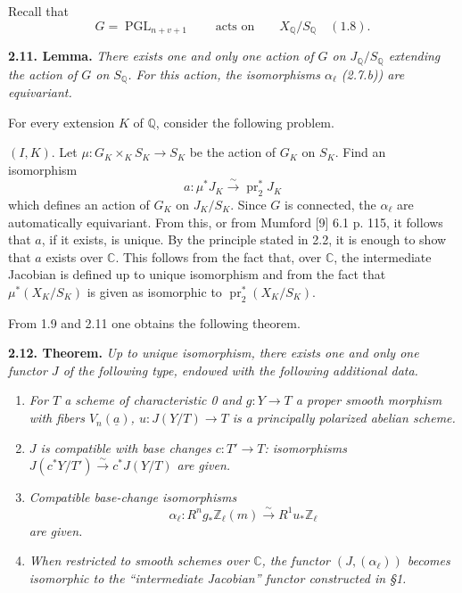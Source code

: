 \documentclass[10pt]{article}
\newcommand{\C}{\mathbb C}
\newcommand{\Q}{\mathbb Q}
\newcommand{\Z}{\mathbb Z}
\newcommand{\PGL}{\operatorname{PGL}}
\newcommand{\pr}{\operatorname{pr}}
\newcommand{\iso}{\xrightarrow{\sim}}
\newcommand{\sourcebreak}{\clearpage}
\begin{document}
Recall that
\[
G=\PGL_{n+v+1}\qquad\text{acts on}\qquad X_\Q/S_\Q\quad(1.8).
\]

\noindent\textbf{2.11. Lemma.} \emph{There exists one and only one action of \(G\) on \(J_\Q/S_\Q\) extending the action of \(G\) on \(S_\Q\). For this action, the isomorphisms \(\alpha_\ell\) (2.7.b)) are equivariant.}

For every extension \(K\) of \(\Q\), consider the following problem.

\noindent\((I,K)\). Let \(\mu:G_K\times_K S_K\longrightarrow S_K\) be the action of \(G_K\) on \(S_K\). Find an isomorphism
\[
a:\mu^*J_K\iso \pr_2^*J_K
\]
which defines an action of \(G_K\) on \(J_K/S_K\). Since \(G\) is connected, the \(\alpha_\ell\) are automatically equivariant. From this, or from Mumford [9] 6.1 p. 115, it follows that \(a\), if it exists, is unique. By the principle stated in 2.2, it is enough to show that \(a\) exists over \(\C\). This follows from the fact that, over \(\C\), the intermediate Jacobian is defined up to unique isomorphism and from the fact that \(\mu^*(X_K/S_K)\) is given as isomorphic to \(\pr_2^*(X_K/S_K)\).

From 1.9 and 2.11 one obtains the following theorem.

\noindent\textbf{2.12. Theorem.} \emph{Up to unique isomorphism, there exists one and only one functor \(J\) of the following type, endowed with the following additional data.}
\begin{enumerate}[label=\alph*)]
\item \emph{For \(T\) a scheme of characteristic 0 and \(g:Y\longrightarrow T\) a proper smooth morphism with fibers \(V_n(\underline a)\), \(u:J(Y/T)\longrightarrow T\) is a principally polarized abelian scheme.}
\item \emph{\(J\) is compatible with base changes \(c:T'\longrightarrow T\): isomorphisms \(J(c^*Y/T')\iso c^*J(Y/T)\) are given.}
\end{enumerate}


\sourcebreak
\begin{enumerate}[label=\alph*)]
\setcounter{enumi}{2}
\item \emph{Compatible base-change isomorphisms}
\[
\alpha_\ell:R^ng_*\Z_\ell(m)\iso R^1u_*\Z_\ell
\]
\emph{are given.}
\item \emph{When restricted to smooth schemes over \(\C\), the functor \((J,(\alpha_\ell))\) becomes isomorphic to the ``intermediate Jacobian'' functor constructed in \S1.}
\end{enumerate}
\end{document}
